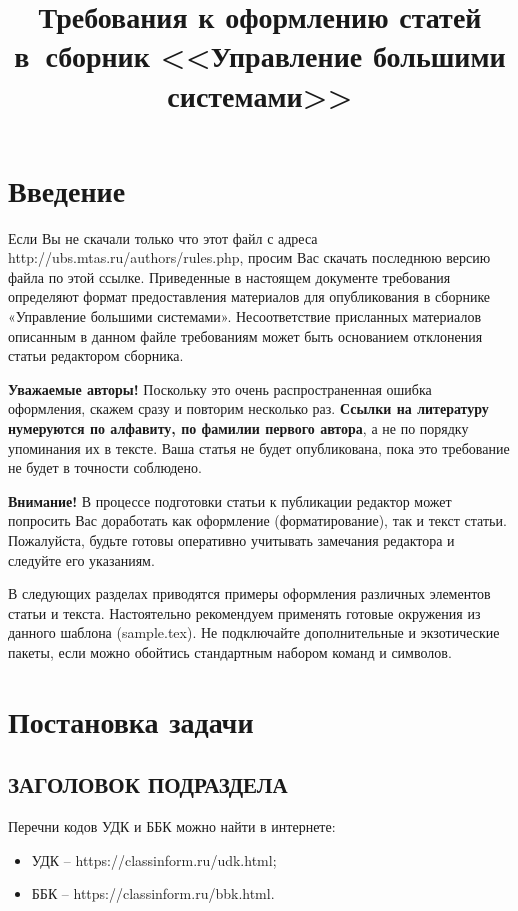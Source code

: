 \documentclass[11pt]{ubs}
\title{Требования к оформлению статей в~сборник <<Управление большими системами>>}%
\begin{document}
\maketitle

\section{Введение}

Если Вы не скачали только что этот файл с адреса http://ubs.mtas.ru/authors/rules.php, просим Вас скачать последнюю версию файла по этой ссылке. Приведенные в настоящем документе требования определяют формат предоставления материалов для опубликования в сборнике «Управление большими системами». Несоответствие присланных материалов описанным в данном файле требованиям может быть основанием отклонения статьи редактором сборника.

\textbf{Уважаемые авторы!} Поскольку это очень распространенная ошибка оформления, скажем сразу и повторим несколько раз. \textbf{Ссылки на литературу нумеруются по алфавиту, по фамилии первого автора}, а не по порядку упоминания их в тексте. Ваша статья не будет опубликована, пока это требование не будет в точности соблюдено.

\textbf{Внимание!} В процессе подготовки статьи к публикации редактор может попросить Вас доработать как оформление (форматирование), так и текст статьи. Пожалуйста, будьте готовы оперативно учитывать замечания редактора и следуйте его указаниям.

В следующих разделах приводятся примеры оформления различных элементов статьи и текста. Настоятельно рекомендуем применять готовые окружения из данного шаблона (sample.tex). Не подключайте дополнительные и экзотические пакеты, если можно обойтись стандартным набором команд и символов.

\section{Постановка задачи}
\subsection{\MakeUppercase{Заголовок подраздела}}
Перечни кодов УДК и ББК можно найти в интернете:
\begin{itemize}
\item УДК – https://classinform.ru/udk.html;
\item ББК – https://classinform.ru/bbk.html.
\end{itemize}
\end{document}
